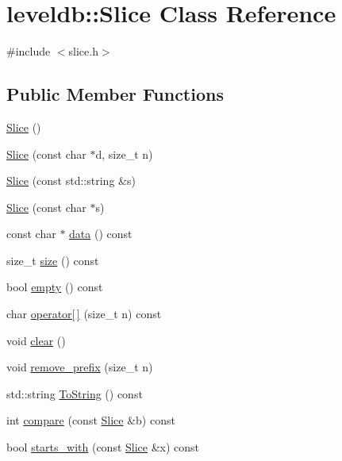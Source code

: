 \hypertarget{classleveldb_1_1_slice}{}\section{leveldb\+:\+:Slice Class Reference}
\label{classleveldb_1_1_slice}


{\ttfamily \#include $<$slice.\+h$>$}

\subsection*{Public Member Functions}
\begin{DoxyCompactItemize}
\item 
\hyperlink{classleveldb_1_1_slice_a5a57e9733fb783aceec1aecfe068ad85}{Slice} ()
\item 
\hyperlink{classleveldb_1_1_slice_ae77bd1d4353bd94d768474d467657c85}{Slice} (const char $\ast$d, size\+\_\+t n)
\item 
\hyperlink{classleveldb_1_1_slice_ab79b60f33aa094179fe36880bc220853}{Slice} (const std\+::string \&s)
\item 
\hyperlink{classleveldb_1_1_slice_a429c530560405fe1a7cd745f7afecf5a}{Slice} (const char $\ast$s)
\item 
const char $\ast$ \hyperlink{classleveldb_1_1_slice_aa64861043d9deee6889461bf0593cf73}{data} () const 
\item 
size\+\_\+t \hyperlink{classleveldb_1_1_slice_a947d3173f04f8a30553e89046daf91d5}{size} () const 
\item 
bool \hyperlink{classleveldb_1_1_slice_a7d0b93d5801bff5656068647759dcb8f}{empty} () const 
\item 
char \hyperlink{classleveldb_1_1_slice_aee7728645cecb259e9804b3b058a40dd}{operator\mbox{[}$\,$\mbox{]}} (size\+\_\+t n) const 
\item 
void \hyperlink{classleveldb_1_1_slice_ab9b6e340e8a483a5cf713f6be17709e3}{clear} ()
\item 
void \hyperlink{classleveldb_1_1_slice_a1be5b22958a115ebecb2b017aad2b3f6}{remove\+\_\+prefix} (size\+\_\+t n)
\item 
std\+::string \hyperlink{classleveldb_1_1_slice_a2cdd9fb649105033fde510afc9416732}{To\+String} () const 
\item 
int \hyperlink{classleveldb_1_1_slice_add751a5852d57a6d0697c85c1e0f3c94}{compare} (const \hyperlink{classleveldb_1_1_slice}{Slice} \&b) const 
\item 
bool \hyperlink{classleveldb_1_1_slice_aac9a3ee9b05567c8c93793e7593a5f13}{starts\+\_\+with} (const \hyperlink{classleveldb_1_1_slice}{Slice} \&x) const 
\end{DoxyCompactItemize}


